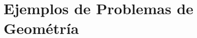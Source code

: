 \documentclass[9pt]{beamer}
\begin{document}
\section[Ejemplos Geometría]{Ejemplos de Problemas de Geométría}

\end{document}

